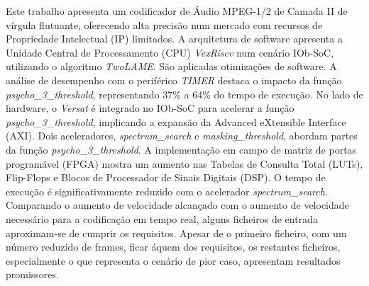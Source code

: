 \hspace{0.4cm} Este trabalho apresenta um codificador de Áudio MPEG-1/2 de Camada II de vírgula flutuante, oferecendo alta precisão num mercado com recursos de Propriedade Intelectual (IP) limitados.
A arquitetura de software apresenta a Unidade Central de Processamento (CPU) \textit{VexRiscv} num cenário IOb-SoC, utilizando o algoritmo \textit{TwoLAME}. São aplicadas otimizações de software. A análise de desempenho com o periférico \textit{TIMER} destaca o impacto da função \textit{psycho\_3\_threshold}, representando 37\% a 64\% do tempo de execução.
No lado de hardware, o \textit{Versat} é integrado no IOb-SoC para acelerar a função \textit{psycho\_3\_threshold}, implicando a expansão da Advanced eXtensible Interface (AXI). Dois aceleradores, \textit{spectrum\_search} e \textit{masking\_threshold}, abordam partes da função \textit{psycho\_3\_threshold}. A implementação em campo de matriz de portas programável (FPGA) mostra um aumento nas Tabelas de Consulta Total (LUTs), Flip-Flops e Blocos de Processador de Sinais Digitais (DSP).
O tempo de execução é significativamente reduzido com o acelerador \textit{spectrum\_search}.
Comparando o aumento de velocidade alcançado com o aumento de velocidade necessário para a codificação em tempo real, alguns ficheiros de entrada aproximam-se de cumprir os requisitos. Apesar de o primeiro ficheiro, com um número reduzido de frames, ficar áquem dos requisitos, os restantes ficheiros, especialmente o que representa o cenário de pior caso, apresentam resultados promissores.
